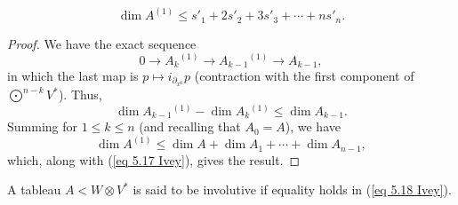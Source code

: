 \begin{prop}\label{prop 5.5.3 Ivey}
    \[\dim A^{(1)}\leq s'_1+2s'_2+3s'_3+\cdots +ns'_n. \label{eq 5.18 Ivey}\]
\end{prop}
\begin{proof}
    We have the exact sequence 
    \[0\to A_k{}^{(1)}\to A_{k-1}{}^{(1)}\to A_{k-1},\]
    in which the last map is $p\mapsto i_{\partial_{x^k}}p$ (contraction with the first component of $\bigodot^{n-k}V^\ast$). Thus, 
    \[\dim A_{k-1}{}^{(1)}-\dim A_k{}^{(1)}\leq \dim A_{k-1}.\]   
    Summing for $1\leq k\leq n$ (and recalling that $A_0=A$), we have 
    \[\dim A^{(1)}\leq \dim A+\dim A_1+\cdots +\dim A_{n-1},\]
    which, along with (\ref{eq 5.17 Ivey}), gives the result.
\end{proof}
\begin{defn}\label{def involutive tableau}
    A tableau $A<W\otimes V^\ast$ is said to be involutive if equality holds in (\ref{eq 5.18 Ivey}).
\end{defn}


